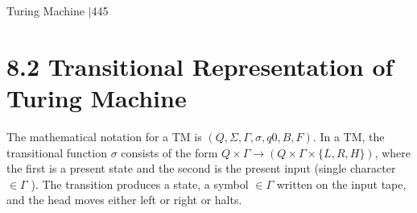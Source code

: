 \documentclass[fontsize=8pt,paper=A4, DIV=9]{scrartcl}
\begin{document}
\vspace*{-3.5cm}

\begin{flushright}
 Turing$ $ Machine $| $445
\end{flushright}




\vspace*{0.5cm}




\section*{8.2 Transitional Representation of Turing Machine}
The mathematical notation for a TM is $(Q, \Sigma,\Gamma,\sigma, q0
, B, F)$. In a TM, the transitional function $\sigma$ consists
of the form $ Q \times \Gamma \rightarrow (Q  \times \Gamma  \times \lbrace L, R, H \rbrace)$, where the first is a present state and the second is the present
input (single character $\in \Gamma$ ). The transition produces a state, a symbol $\in \Gamma$ written on the input tape, and
the head moves either left or right or halts.
\end{document}
